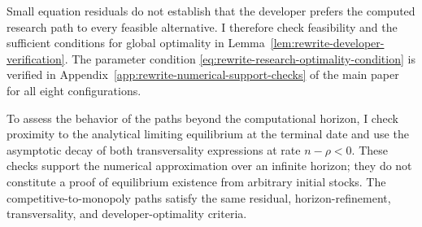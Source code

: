 Small equation residuals do not establish that the developer prefers the
computed research path to every feasible alternative. I therefore check
feasibility and the sufficient conditions for global optimality in
Lemma~\ref{lem:rewrite-developer-verification}. The parameter condition
\eqref{eq:rewrite-research-optimality-condition} is verified in
Appendix~\ref{app:rewrite-numerical-support-checks} of the main paper for
all eight configurations.

To assess the behavior of the paths beyond the computational horizon, I check proximity
to the analytical limiting equilibrium at the terminal date and use the
asymptotic decay of both transversality
expressions at rate $n-\rho<0$. These checks support the numerical
approximation over an infinite horizon; they do not constitute a proof
of equilibrium existence from arbitrary initial stocks.
The competitive-to-monopoly paths satisfy the same residual,
horizon-refinement, transversality, and developer-optimality criteria.


